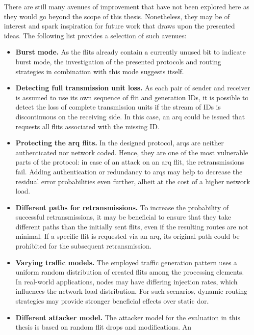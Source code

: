 There are still many avenues of improvement that have not been explored here as they would go beyond the scope of this thesis. Nonetheless, they may
be of interest and spark inspiration for future work that draws upon the presented ideas. The following list provides a selection of such avenues:
\begin{itemize}
    \item \textbf{Burst mode.} As the flits already contain a currently unused bit to indicate burst mode, the investigation of the presented
        protocols and routing strategies in combination with this mode suggests itself.
    \item \textbf{Detecting full transmission unit loss.} As each pair of sender and receiver is assumed to use its own sequence of flit and
        generation IDs, it is possible to detect the loss of complete transmission units if the stream of IDs is discontinuous on the receiving side.
        In this case, an \gls{arq} could be issued that requests all flits associated with the missing ID.
    \item \textbf{Protecting the \gls{arq} flits.} In the designed protocol, \glspl{arq} are neither authenticated nor network coded. Hence, they are
        one of the most vulnerable parts of the protocol: in case of an attack on an \gls{arq} flit, the retransmissions fail. Adding authentication
        or redundancy to \glspl{arq} may help to decrease the residual error probabilities even further, albeit at the cost of a higher network load.
    \item \textbf{Different paths for retransmissions.} To increase the probability of successful retransmissions, it may be beneficial to ensure that
        they take different paths than the initially sent flits, even if the resulting routes are not minimal. If a specific flit is requested via an
        \gls{arq}, its original path could be prohibited for the subsequent retransmission.
    \item \textbf{Varying traffic models.} The employed traffic generation pattern uses a uniform random distribution of created flits
        among the processing elements. In real-world applications, nodes may have differing injection rates, which influences the network load
        distribution. For such scenarios, dynamic routing strategies may provide stronger beneficial effects over static \gls{dor}.
    \item \textbf{Different attacker model.} The attacker model for the evaluation in this thesis is based on random flit drops and modifications. An

\end{itemize}
